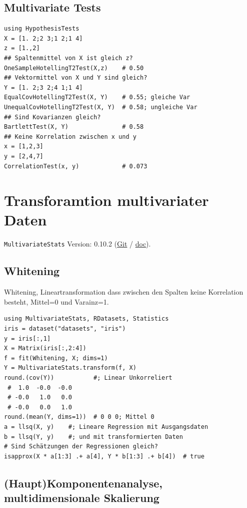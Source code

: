 \documentclass[10pt,twocolumn]{scrartcl}
\begin{document}
\subsection{Multivariate Tests}

\begin{lstlisting}
using HypothesisTests
X = [1. 2;2 3;1 2;1 4]
z = [1.,2]
## Spaltenmittel von X ist gleich z?
OneSampleHotellingT2Test(X,z)    # 0.50
## Vektormittel von X und Y sind gleich?
Y = [1. 2;3 2;4 1;1 4]
EqualCovHotellingT2Test(X, Y)    # 0.55; gleiche Var
UnequalCovHotellingT2Test(X, Y)  # 0.58; ungleiche Var
## Sind Kovarianzen gleich?
BartlettTest(X, Y)               # 0.58
## Keine Korrelation zwischen x und y
x = [1,2,3]
y = [2,4,7]
CorrelationTest(x, y)            # 0.073
\end{lstlisting}

\section{Transforamtion multivariater Daten}

\lstinline|MultivariateStats|
 Version: 0.10.2
(\href{https://github.com/JuliaStats/MultivariateStats.jl}{Git} /
\href{https://juliastats.org/MultivariateStats.jl}{doc}).

\subsection{Whitening}

Whitening, Lineartransformation dass zwischen den Spalten keine Korrelation besteht, Mittel=0 und Varainz=1.

\begin{lstlisting}
using MultivariateStats, RDatasets, Statistics
iris = dataset("datasets", "iris")
y = iris[:,1]
X = Matrix(iris[:,2:4])
f = fit(Whitening, X; dims=1)
Y = MultivariateStats.transform(f, X)
round.(cov(Y))           #; Linear Unkorreliert
 #  1.0  -0.0  -0.0
 # -0.0   1.0   0.0
 # -0.0   0.0   1.0
round.(mean(Y, dims=1))  # 0 0 0; Mittel 0
a = llsq(X, y)    #; Lineare Regression mit Ausgangsdaten
b = llsq(Y, y)    #; und mit transformierten Daten
# Sind Schätzungen der Regressionen gleich?
isapprox(X * a[1:3] .+ a[4], Y * b[1:3] .+ b[4])  # true
\end{lstlisting}

\subsection{(Haupt)Komponentenanalyse, multidimensionale Skalierung}
\end{document}
